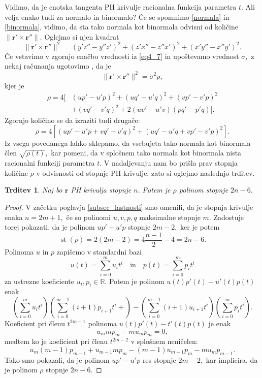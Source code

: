 \documentclass[12pt,a4paper,twoside]{article}
\theoremstyle{definition} %
\theoremstyle{plain} %
\newtheorem{trditev}[definicija]{Trditev}
\theoremstyle{primerstyle}
\numberwithin{equation}{section}  %
\newcommand{\R}{\mathbb R}
\newcommand{\rV}{\mathbf{r}}
\DeclareMathOperator{\st}{st}
\begin{document}
Vidimo, da je enotska tangenta PH krivulje racionalna funkcija parametra $t.$ Ali velja enako tudi za normalo in binormalo? Če se spomnimo \eqref{normala} in \eqref{binormala}, vidimo, da sta tako normala kot binormala odvisni od količine $\lVert \rV' \times \rV'' \rVert.$ Oglejmo si njen kvadrat
\begin{equation}
	\label{eq4_12}
	\lVert \rV' \times \rV'' \rVert^2=(y'z''-y''z')^2+(z'x''-z''x')^2+(x'y''-x''y')^2.
\end{equation}
Če vstavimo v zgornjo enačbo vrednosti iz \eqref{eq4_7} in upoštevamo vrednost $\sigma,$ z nekaj računanja ugotovimo \cite{farouki2002exact}, da je
\begin{equation}
	\label{eq4_13}
	\lVert \rV' \times \rV'' \rVert^2=\sigma^2\rho,
\end{equation}
kjer je
\begin{align}
	\rho=4[&(up'-u'p)^2+(uq'-u'q)^2+(vp'-v'p)^2 \nonumber \\
	&+(vq'-v'q)^2+2(uv'-u'v)(pq'-p'q)]. \label{rho1}
\end{align}
Zgornjo količino se da izraziti \cite{beltranmonterde} tudi drugače:
\begin{equation}
	\label{rho2}
	\rho=4[(up'-u'p+vq'-v'q)^2+(uq'-u'q+vp'-v'p)^2].
\end{equation}
Iz vsega povedanega lahko sklepamo, da vsebujeta tako normala kot binormala člen $\sqrt{\rho(t)},$ kar pomeni, da v splošnem tako normala kot binormala nista racionalni funkciji parametra $t.$ V nadaljevanju nam bo prišla prav stopnja količine $\rho$ v odvisnosti od stopnje PH krivulje, zato si oglejmo naslednjo trditev.
\begin{trditev}
	\label{stopnja_rho_trditev}
	Naj bo $\rV$ PH krivulja stopnje $n.$ Potem je $\rho$ polinom stopnje $2n-6.$
\end{trditev}
\begin{proof}
	V začetku poglavja \ref{subsec_lastnosti} smo omenili, da je stopnja krivulje enaka $n=2m+1,$ če so polinomi $u,v,p,q$ maksimalne stopnje $m.$ Zadostuje torej pokazati, da je polinom $up'-u'p$ stopnje $2m-2,$ ker je potem $$\st(\rho)=2(2m-2)=4\frac{n-1}{2}-4=2n-6.$$ Polinoma $u$ in $p$ zapišemo v standardni bazi
	$$u(t)=\sum_{i=0}^mu_it^i\quad\text{in}\quad p(t)=\sum_{i=0}^mp_it^i$$
	za ustrezne koeficiente $u_i,p_i\in\R.$ Potem je polinom $u(t)p'(t)-u'(t)p(t)$ enak
	\begin{equation*}
		\left(\sum_{i=0}^mu_it^i\right)\left(\sum_{i=0}^{m-1}(i+1)p_{i+1}t^i+\right)-\left(\sum_{i=0}^{m-1}(i+1)u_{i+1}t^i\right)\left(\sum_{i=0}^mp_it^i\right).
	\end{equation*}
	Koeficient pri členu $t^{2m-1}$ polinoma $u(t)p'(t)-t'(t)p(t)$ je enak
	$$u_mmp_m-mu_mp_m=0,$$
	medtem ko je koeficient pri členu $t^{2m-2}$ v splošnem neničelen:
	$$u_m(m-1)p_{m-1}+u_{m-1}mp_m-(m-1)u_{m-1}p_m-mu_mp_{m-1}.$$
	Tako smo pokazali, da je polinom $up'-u'p$ res stopnje $2m-2,$ kar implicira, da je polinom $\rho$ stopnje $2n-6.$
\end{proof}
\end{document}
